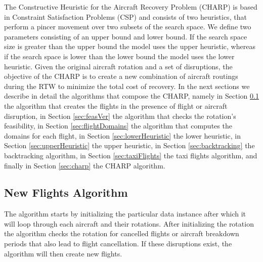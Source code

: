 

\newcommand\mycommfont[1]{\footnotesize\ttfamily\textcolor{blue}{#1}}



%
	
	The Constructive Heuristic for the Aircraft Recovery Problem (CHARP) is based in Constraint Satisfaction Problems (CSP) and consists of two heuristics, that perform a pincer movement over two subsets of the search space. We define two parameters consisting of an upper bound and lower bound. If the search space size is greater than the upper bound the model uses the upper heuristic, whereas if the search space is lower than the lower bound the model uses the lower heuristic.
	 Given the original aircraft rotation and a set of disruptions, the objective of the CHARP is to create a new combination of aircraft routings during the RTW to minimize the total cost of recovery. 
	In the next sections we describe in detail the algorithms that compose the CHARP, namely in Section \ref{sec:newFlightsAlgo} the algorithm that creates the flights in the presence of flight or aircraft disruption, in Section \ref{sec:feasVer}  the algorithm that checks the rotation's feasibility, in Section \ref{sec:flightDomains} the algorithm that computes the domains for each flight, in Section \ref{sec:lowerHeuristic} the lower heuristic, in Section \ref{sec:upperHeuristic} the upper heuristic, in Section \ref{sec:backtracking}  the backtracking algorithm, in Section \ref{sec:taxiFlights} the taxi flights algorithm, and finally in Section \ref{sec:charp} the CHARP algorithm.


	\subsection{New Flights Algorithm} \label{sec:newFlightsAlgo}
	The algorithm starts by initializing the particular data instance after which it will loop through each aircraft and their rotations. After initializing the rotation the algorithm checks the rotation for cancelled flights or aircraft breakdown periods that also lead to flight cancellation. If these disruptions exist, the algorithm will then create new flights.
	
